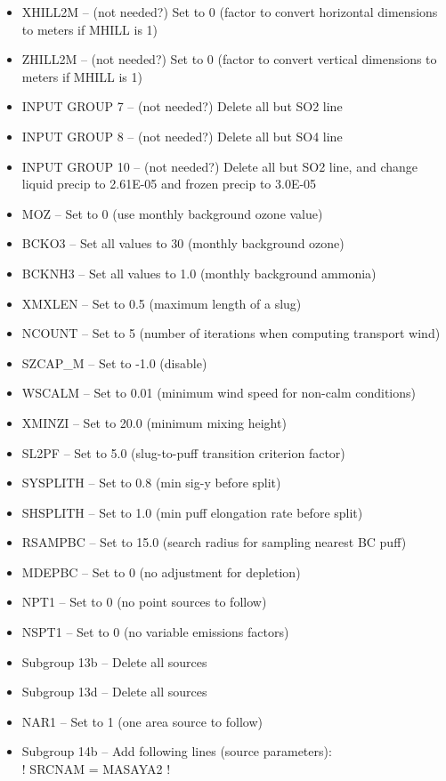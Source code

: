 \documentclass[10pt,a4paper]{article}
\newcommand\tab[1][0.5cm]{\hspace*{#1}}
\begin{document}
\begin{itemize}
\begin{itemize}
\item XHILL2M -- (not needed?) Set to 0 (factor to convert horizontal dimensions to meters if MHILL is 1)
\item ZHILL2M -- (not needed?) Set to 0 (factor to convert vertical dimensions to meters if MHILL is 1)
\item INPUT GROUP 7 -- (not needed?) Delete all but SO2 line
\item INPUT GROUP 8 -- (not needed?) Delete all but SO4 line
\item INPUT GROUP 10 -- (not needed?) Delete all but SO2 line, and change liquid precip to 2.61E-05 and frozen precip to 3.0E-05
\item MOZ -- Set to 0 (use monthly background ozone value)
\item BCKO3 -- Set all values to 30 (monthly background ozone)
\item BCKNH3 -- Set all values to 1.0 (monthly background ammonia)
\item XMXLEN -- Set to 0.5 (maximum length of a slug)
\item NCOUNT -- Set to 5 (number of iterations when computing transport wind)
\item SZCAP\_M -- Set to -1.0 (disable)
\item WSCALM -- Set to 0.01 (minimum wind speed for non-calm conditions)
\item XMINZI -- Set to 20.0 (minimum mixing height)
\item SL2PF -- Set to 5.0 (slug-to-puff transition criterion factor)
\item SYSPLITH -- Set to 0.8 (min sig-y before split)
\item SHSPLITH -- Set to 1.0 (min puff elongation rate before split)
\item RSAMPBC -- Set to 15.0 (search radius for sampling nearest BC puff)
\item MDEPBC -- Set to 0 (no adjustment for depletion)
\item NPT1 -- Set to 0 (no point sources to follow)
\item NSPT1 -- Set to 0 (no variable emissions factors)
\item Subgroup 13b -- Delete all sources
\item Subgroup 13d -- Delete all sources
\item NAR1 -- Set to 1 (one area source to follow)
\item Subgroup 14b -- Add following lines (source parameters):\\
\tab ! SRCNAM = MASAYA2 !\\

\end{itemize}
\end{itemize}
\end{document}
